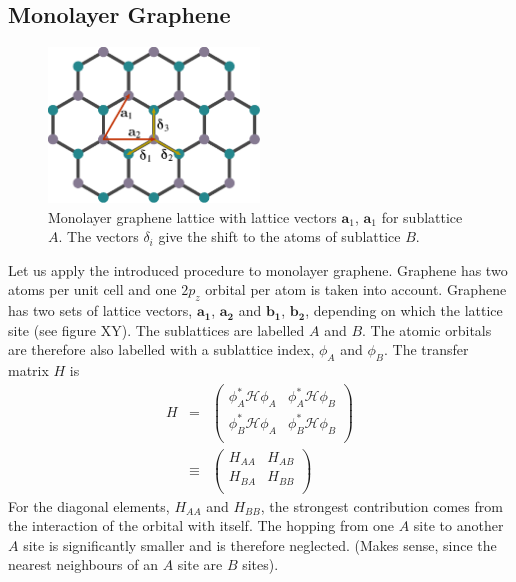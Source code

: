 \subsection{Monolayer Graphene}

\begin{figure}
\centering
\includegraphics[width=0.5\textwidth]{figure/numericalframework/graphene_lattice_single_layer_csch}
\caption{Monolayer graphene lattice with lattice vectors $\mathbf{a}_1$, $\mathbf{a}_1$ for sublattice $A$. The vectors $\delta_i$ give the shift to the atoms of sublattice $B$. }
\end{figure}
Let us apply the introduced procedure to monolayer graphene. Graphene has two atoms per unit cell and  one $2p_z$ orbital per atom is taken into account. Graphene has two sets of lattice vectors, $\mathbf{a_1}$, $\mathbf{a_2}$ and $\mathbf{b_1}$, $\mathbf{b_2}$, depending on which the lattice site (see figure XY). The sublattices are labelled $A$ and $B$. The atomic orbitals are therefore also labelled with a sublattice index, $\phi_A$ and $\phi_B$. The transfer matrix $H$ is
\begin{eqnarray}
H &=& \begin{pmatrix}
\phi_A^* \mathcal{H} \phi_A & \phi_A^* \mathcal{H} \phi_B \\
\phi_B^* \mathcal{H} \phi_A & \phi_B^* \mathcal{H} \phi_B\\
\end{pmatrix} \\
&\equiv& \begin{pmatrix}
H_{A A} & H_{A B} \\
H_{B A} & H_{B B}\\
\end{pmatrix}
\end{eqnarray}
For the diagonal elements, $H_{A A}$ and $H_{B B}$, the strongest contribution comes from the interaction of the orbital with itself. The hopping from one $A$ site to another $A$ site is significantly smaller and is therefore neglected. (Makes sense, since the nearest neighbours of an $A$ site are $B$ sites).
